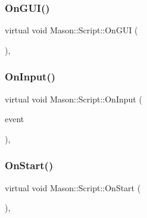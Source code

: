 \hypertarget{class_mason_1_1_script_aa993a4ef5572ba31f5fa0ce2fa4a733e}{}\label{class_mason_1_1_script_aa993a4ef5572ba31f5fa0ce2fa4a733e} 
\subsubsection{\texorpdfstring{On\+G\+U\+I()}{OnGUI()}}
{\footnotesize\ttfamily virtual void Mason\+::\+Script\+::\+On\+G\+UI (\begin{DoxyParamCaption}{ }\end{DoxyParamCaption})\hspace{0.3cm}{\ttfamily [inline]}, {\ttfamily [virtual]}}

\hypertarget{class_mason_1_1_script_a84fff8072c4e8b56fb242b29f3491224}{}\label{class_mason_1_1_script_a84fff8072c4e8b56fb242b29f3491224} 
\subsubsection{\texorpdfstring{On\+Input()}{OnInput()}}
{\footnotesize\ttfamily virtual void Mason\+::\+Script\+::\+On\+Input (\begin{DoxyParamCaption}\item[{S\+D\+L\+\_\+\+Event}]{event }\end{DoxyParamCaption})\hspace{0.3cm}{\ttfamily [inline]}, {\ttfamily [virtual]}}

\hypertarget{class_mason_1_1_script_aa42915c752bb7f4623ca679b222edf2f}{}\label{class_mason_1_1_script_aa42915c752bb7f4623ca679b222edf2f} 
\subsubsection{\texorpdfstring{On\+Start()}{OnStart()}}
{\footnotesize\ttfamily virtual void Mason\+::\+Script\+::\+On\+Start (\begin{DoxyParamCaption}{ }\end{DoxyParamCaption})\hspace{0.3cm}{\ttfamily [inline]}, {\ttfamily [virtual]}}

\hypertarget{class_mason_1_1_script_acafa4283460fb677484bb43ebec37743}{}\label{class_mason_1_1_script_acafa4283460fb677484bb43ebec37743} 
